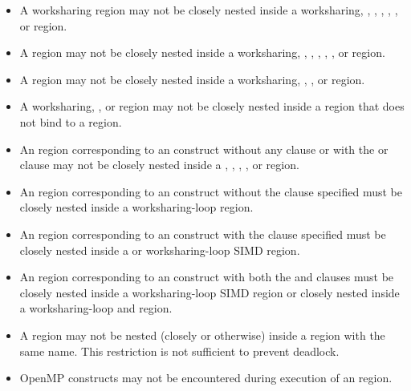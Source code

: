 \begin{itemize}
\item A worksharing region may not be closely nested inside a worksharing,
, , , ,
, or  region.

\item A  region may not be closely nested inside a worksharing,
, , , ,
, or  region.

\item A  region may not be closely nested inside a worksharing,
, , or  region.

\item A worksharing, , or  region may not be
    closely nested inside a  region that does not bind to a
     region.

\item An  region corresponding to an  construct without
any clause or with the  or  clause may not be closely
nested inside a , , , ,
or  region.

\item An  region corresponding to an  construct without
the  clause specified must be closely nested inside a worksharing-loop region.

\item An  region corresponding to an  construct with the
 clause specified must be closely nested inside a  or
    worksharing-loop SIMD region.

\item An  region corresponding to an  construct with
  both the  and  clauses must be closely nested inside
  a worksharing-loop SIMD region or closely nested inside a worksharing-loop and  region.

\item A  region may not be nested (closely or otherwise) inside a 
region with the same name. This restriction is not sufficient to prevent
deadlock.

\item OpenMP constructs may not be encountered during execution of an
 region.


\end{itemize}
